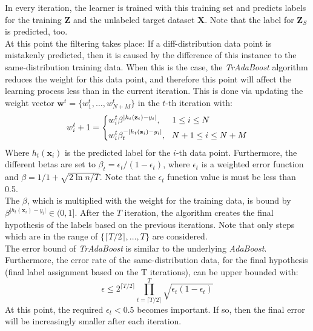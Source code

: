 In every iteration, the learner is trained with this training set and predicts labels for the training $\mathbf{Z}$ and the unlabeled target dataset $\mathbf{X}$.
Note that the label for $\mathbf{Z}_S$ is predicted, too.\cite{Dai.}\\
At this point the filtering takes place:
If a diff-distribution data point is mistakenly predicted, then it is caused by the difference of this instance to the same-distribution training data.
When this is the case, the \textit{TrAdaBoost} algorithm reduces the weight for this data point, and therefore this point will affect the learning process less than in the current iteration.
This is done via updating the weight vector $\mathbf{w}^t=\{w_1^t,\dots,w_{N+M}^t\}$ in the $t$-th iteration with:\cite{Dai.}
\begin{equation}\label{EqTrAdaWeighting}
	w_i^t+1=\begin{dcases}
				w_i^t\beta^{\vert h_t(\mathbf{z}_i )-y_i\vert}, \>\>\>\>\>\> 1\le i \le N \\
				w_i^t\beta_t^{-\vert h_t(\mathbf{z}_i )-y_i\vert}, \>\>\> N+1\le i \le N+M
			 \end{dcases}
\end{equation}
Where $ h_t(\mathbf{x}_i )$ is the predicted label for the $i$-th data point.
Furthermore, the different betas are set to $\beta_t = \epsilon_t / (1-\epsilon_t)$, where $\epsilon_t$ is a weighted error function and $\beta= 1 / 1 + \sqrt{2\ln n/T}$.
Note that the $\epsilon_t$ function value is must be less than 0.5.\\
The $\beta$, which is multiplied with the weight for the training data, is bound by $\beta^{\vert h_t(\mathbf{x}_i )-y_i\vert} \in (0,1]$.
After the $T$ iteration, the algorithm creates the final hypothesis of the labels based on the previous iterations.
Note that only steps which are in the range of $\{\lceil T /2 \rceil,\dots,T\}$ are considered.\cite{Dai.}\\
The error bound of \textit{TrAdaBoost} is similar to the underlying \textit{AdaBoost}.
Furthermore, the error rate of the same-distribution data, for the final hypothesis (final label assignment based on the T iterations), can be upper bounded with:
\begin{equation}
	\epsilon \le 2^{\lceil T / 2\rceil} \prod_{t=\lceil T / 2\rceil}^{T} \sqrt{\epsilon_t(1-\epsilon_t)}
\end{equation}
At this point, the required $\epsilon_t < 0.5$ becomes important.
If so, then the final error will be increasingly smaller after each iteration.\cite{Dai.}

